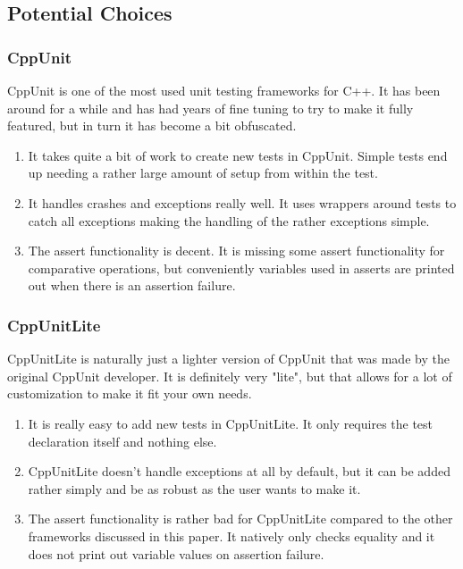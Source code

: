 \documentclass[onecolumn, draftclsnofoot,10pt, compsoc]{IEEEtran}
\begin{document}
\subsection{Potential Choices}

\subsubsection{CppUnit}
CppUnit is one of the most used unit testing frameworks for C++. 
It has been around for a while and has had years of fine tuning to try to make it fully featured, but in turn it has become a bit obfuscated.
\begin{enumerate}
\item It takes quite a bit of work to create new tests in CppUnit. Simple tests end up needing a rather large amount of setup from within the test.
\item It handles crashes and exceptions really well. It uses wrappers around tests to catch all exceptions making the handling of the rather exceptions simple.
\item The assert functionality is decent. It is missing some assert functionality for comparative operations, but conveniently variables used in asserts are printed out when there is an assertion failure.
\end{enumerate}

\subsubsection{CppUnitLite}
CppUnitLite is naturally just a lighter version of CppUnit that was made by the original CppUnit developer. 
It is definitely very "lite", but that allows for a lot of customization to make it fit your own needs.  
\begin{enumerate}
\item It is really easy to add new tests in CppUnitLite. It only requires the test declaration itself and nothing else.
\item CppUnitLite doesn't handle exceptions at all by default, but it can be added rather simply and be as robust as the user wants to make it.
\item The assert functionality is rather bad for CppUnitLite compared to the other frameworks discussed in this paper. It natively only checks equality and it does not print out variable values on assertion failure.
\end{enumerate}
\end{document}
